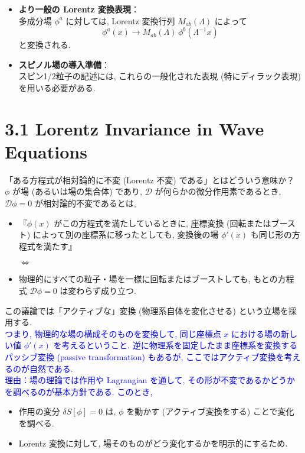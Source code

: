 \documentclass[a4paper,12pt]{article}
\begin{document}
\begin{itemize}
  \item \textbf{より一般の Lorentz 変換表現}：\\
  多成分場 $\phi^a$ に対しては, Lorentz 変換行列 $M_{ab}(\Lambda)$ によって
  \begin{equation*}
    \phi^a(x) \to M_{ab}(\Lambda)\, \phi^b(\Lambda^{-1}x)
  \end{equation*}
  と変換される.

  \item \textbf{スピノル場の導入準備}：\\
  スピン1/2粒子の記述には, これらの一般化された表現 (特にディラック表現) を用いる必要がある.
\end{itemize}
\newpage
\color{black}
\section*{3.1 Lorentz Invariance in Wave Equations}
「ある方程式が相対論的に不変 (Lorentz 不変) である」とはどういう意味か？\\
$\phi$ が場 (あるいは場の集合体) であり, $\mathcal{D}$ が何らかの微分作用素であるとき, $\mathcal{D}\phi = 0$ が相対論的不変であるとは, 
\begin{itemize}
    \item『$\phi(x)$ がこの方程式を満たしているときに, 座標変換 (回転またはブースト) によって別の座標系に移ったとしても, 変換後の場 $\phi'(x)$ も同じ形の方程式を満たす』

\hspace{2cm}$\Longleftrightarrow$

    \item 物理的にすべての粒子・場を一様に回転またはブーストしても, もとの方程式 $\mathcal{D}\phi = 0$ は変わらず成り立つ.
\end{itemize}
この議論では「アクティブな」変換 (物理系自体を変化させる) という立場を採用する.\\
\textcolor{blue}{つまり, 物理的な場の構成そのものを変換して, 同じ座標点 $x$ における場の新しい値 $\phi'(x)$ を考えるということ. 逆に物理系を固定したまま座標系を変換するパッシブ変換 (passive transformation) もあるが, ここではアクティブ変換を考えるのが自然である.}\\
\textcolor{blue}{理由：場の理論では作用や Lagrangian を通して, その形が不変であるかどうかを調べるのが基本方針である. このとき,}
\color{blue}
  \begin{itemize}
    \item 作用の変分 $\delta S[\phi] = 0$ は, $\phi$ を動かす (アクティブ変換をする) ことで変化を調べる.
    \item Lorentz 変換に対して, 場そのものがどう変化するかを明示的にするため.
  \end{itemize}
\color{black}
\end{document}

